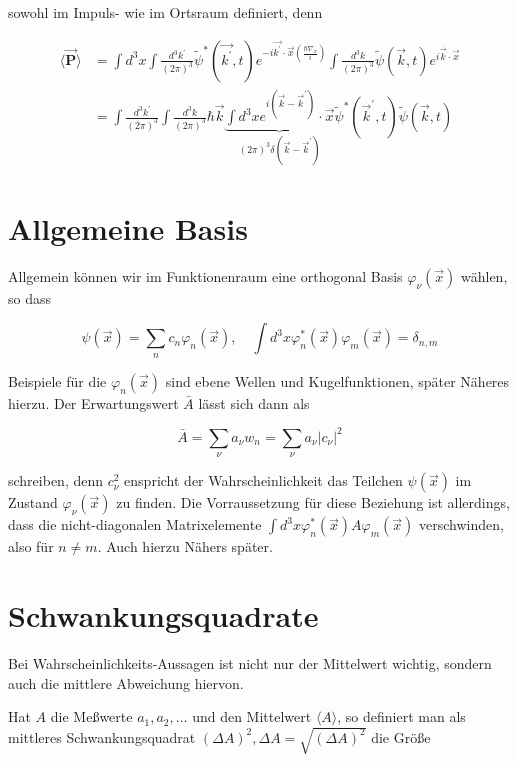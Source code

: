 \documentclass[10pt, letterpaper]{article}
\begin{document}
sowohl im Impuls- wie im Ortsraum definiert, denn

$$
\begin{aligned}
\langle\overrightarrow{\mathbf{P}}\rangle & =\int d^{3} x \int \frac{d^{3} k^{\prime}}{(2 \pi)^{3}} \tilde{\psi}^{*}\left(\overrightarrow{k^{\prime}}, t\right) e^{-i \overrightarrow{k^{\prime}} \cdot \vec{x}\left(\frac{\hbar \nabla_{x}}{i}\right)} \int \frac{d^{3} k}{(2 \pi)^{3}} \tilde{\psi}(\vec{k}, t) e^{i \vec{k} \cdot \vec{x}} \\
& =\int \frac{d^{3} k^{\prime}}{(2 \pi)^{3}} \int \frac{d^{3} k}{(2 \pi)^{3}} \hbar \vec{k} \underbrace{\int d^{3} x e^{i\left(\vec{k}-\vec{k}^{\prime}\right)} \cdot \vec{x}}_{(2 \pi)^{3} \delta\left(\vec{k}-\vec{k}^{\prime}\right)} \tilde{\psi}^{*}\left(\vec{k}^{\prime}, t\right) \tilde{\psi}(\vec{k}, t)
\end{aligned}
$$

\section*{Allgemeine Basis}
Allgemein können wir im Funktionenraum eine orthogonal Basis $\varphi_{\nu}(\vec{x})$ wählen, so dass

$$
\psi(\vec{x})=\sum_{n} c_{n} \varphi_{n}(\vec{x}), \quad \int d^{3} x \varphi_{n}^{*}(\vec{x}) \varphi_{m}(\vec{x})=\delta_{n, m}
$$

Beispiele für die $\varphi_{n}(\vec{x})$ sind ebene Wellen und Kugelfunktionen, später Näheres hierzu. Der Erwartungswert $\bar{A}$ lässt sich dann als

$$
\bar{A}=\sum_{\nu} a_{\nu} w_{n}=\sum_{\nu} a_{\nu}\left|c_{\nu}\right|^{2}
$$

schreiben, denn $c_{\nu}^{2}$ enspricht der Wahrscheinlichkeit das Teilchen $\psi(\vec{x})$ im Zustand $\varphi_{\nu}(\vec{x})$ zu finden. Die Vorraussetzung für diese Beziehung ist allerdings, dass die nicht-diagonalen Matrixelemente $\int d^{3} x \varphi_{n}^{*}(\vec{x}) A \varphi_{m}(\vec{x})$ verschwinden, also für $n \neq m$. Auch hierzu Nähers später.

\section*{Schwankungsquadrate}
Bei Wahrscheinlichkeits-Aussagen ist nicht nur der Mittelwert wichtig, sondern auch die mittlere Abweichung hiervon.

Hat $A$ die Meßwerte $a_{1}, a_{2}, \ldots$ und den Mittelwert $\langle A\rangle$, so definiert man als mittleres Schwankungsquadrat $(\Delta A)^{2}, \Delta A=\sqrt{(\Delta A)^{2}}$ die Größe
\end{document}
